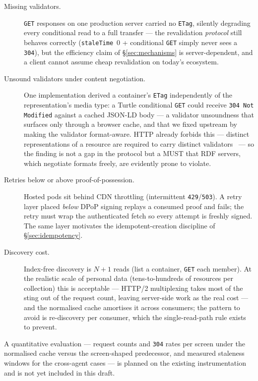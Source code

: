 \documentclass[11pt,a4paper]{article}
\theoremstyle{remark}
\newcommand{\code}[1]{\texttt{#1}}
\begin{document}
\begin{description}
\item[Missing validators.] \code{GET} responses on one production server
  carried no \code{ETag}, silently degrading every conditional read to a full
  transfer --- the revalidation \emph{protocol} still behaves correctly
  (\code{staleTime}~0 + conditional \code{GET} simply never sees a \code{304}),
  but the efficiency claim of \S\ref{sec:mechanisms} is server-dependent, and a
  client cannot assume cheap revalidation on today's ecosystem.
\item[Unsound validators under content negotiation.] One implementation derived
  a container's \code{ETag} independently of the representation's media type: a
  Turtle conditional \code{GET} could receive \code{304 Not Modified} against a
  cached JSON-LD body --- a validator unsoundness that surfaces only through a
  browser cache, and that we fixed upstream by making the validator
  format-aware. HTTP already forbids this --- distinct representations of a
  resource are required to carry distinct validators~\cite{rfc9110} --- so the
  finding is not a gap in the protocol but a MUST that RDF servers, which
  negotiate formats freely, are evidently prone to violate.
\item[Retries below or above proof-of-possession.] Hosted pods sit behind CDN
  throttling (intermittent \code{429}/\code{503}). A retry layer placed
  \emph{below} DPoP signing replays a consumed proof and fails; the retry must
  wrap the authenticated fetch so every attempt is freshly signed. The same
  layer motivates the idempotent-creation discipline of \S\ref{sec:idempotency}.
\item[Discovery cost.] Index-free discovery is $N{+}1$ reads (list a container,
  \code{GET} each member). At the realistic scale of personal data
  (tens-to-hundreds of resources per collection) this is acceptable ---
  HTTP/2 multiplexing takes most of the sting out of the request count, leaving
  server-side work as the real cost --- and the normalised cache amortises it
  across consumers; the pattern to avoid is re-discovery per consumer, which
  the single-read-path rule exists to prevent.
\end{description}

A quantitative evaluation --- request counts and \code{304} rates per screen
under the normalised cache versus the screen-shaped predecessor, and measured
staleness windows for the cross-agent cases --- is planned on the existing
instrumentation and is not yet included in this draft.
\end{document}
